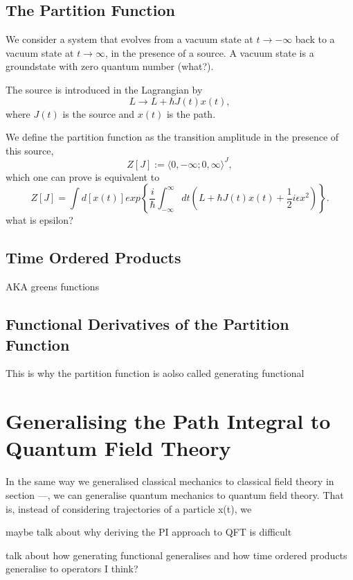 \documentclass[11pt, a4paper]{article}
\theoremstyle{definition}
\theoremstyle{plain}
\begin{document}
\subsection{The Partition Function}
We consider a system that evolves from a vacuum state at $t \to -\infty$ back to 
a vacuum state at $t \to \infty$, in the 
presence of a source. A vacuum state is a groundstate with zero quantum number (what?). 

The source is introduced 
in the Lagrangian by 
\begin{equation}
L \to L + \hbar J(t)x(t),
\end{equation}
where $J(t)$ is the source and $x(t)$ is the path.

We define the partition function as the transition amplitude in the presence of this source,
\begin{equation}
Z[J]:= \langle 0,-\infty ; 0, \infty \rangle ^J,
\end{equation}
which one can prove is equivalent to 
\begin{equation}
Z[J]= \int d[x(t)] exp\left\{\frac{i}{\hbar}\int^{\infty}_{-\infty}dt (L + \hbar J(t) x(t) + \frac{1}{2} i \epsilon x^2) \right\}.
\end{equation}
what is epsilon?



\subsection{Time Ordered Products}
AKA greens functions
\subsection{Functional Derivatives of the Partition Function}
This is why the partition function is aolso called generating functional

\section{Generalising the Path Integral to Quantum Field Theory}
In the same way we generalised classical mechanics to 
classical field theory in section ---, we can generalise 
quantum mechanics to quantum field theory. That is, instead 
of considering trajectories of a particle x(t), we

maybe talk about why deriving the PI approach to QFT is difficult

talk about how generating functional generalises and how time ordered products generalise to operators I think?
\end{document}
